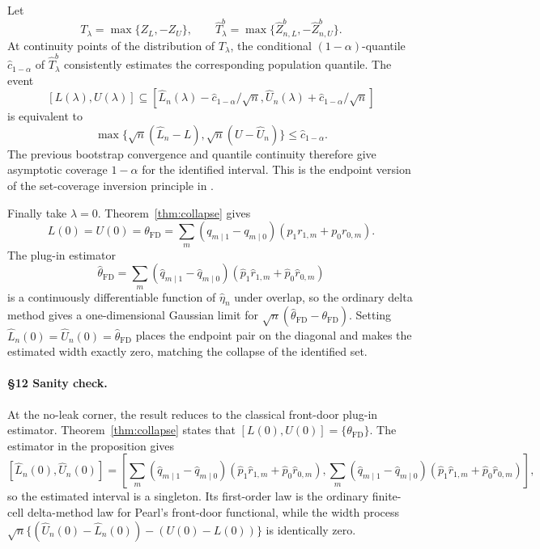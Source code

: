 Let
\[
  T_\lambda
  =
  \max\{Z_L,-Z_U\},
  \qquad
  \widehat T_\lambda^b
  =
  \max\{\widehat Z_{n,L}^b,-\widehat Z_{n,U}^b\}.
\]
At continuity points of the distribution of \(T_\lambda\), the conditional
\((1-\alpha)\)-quantile \(\widehat c_{1-\alpha}\) of
\(\widehat T_\lambda^b\) consistently estimates the corresponding population
quantile.  The event
\[
  [L(\lambda),U(\lambda)]
  \subseteq
  [\widehat L_n(\lambda)-\widehat c_{1-\alpha}/\sqrt n,
   \widehat U_n(\lambda)+\widehat c_{1-\alpha}/\sqrt n]
\]
is equivalent to
\[
  \max\{\sqrt n(\widehat L_n-L),\sqrt n(U-\widehat U_n)\}
  \le \widehat c_{1-\alpha}.
\]
The previous bootstrap convergence and quantile continuity therefore give asymptotic
coverage \(1-\alpha\) for the identified interval.  This is the endpoint version of
the set-coverage inversion principle in
\citet{ChernozhukovHongTamer2007ParameterSets}.

Finally take \(\lambda=0\).  Theorem~\ref{thm:collapse} gives
\[
  L(0)=U(0)=\theta_{\mathrm{FD}}
  =
  \sum_m(q_{m\mid1}-q_{m\mid0})(p_1r_{1,m}+p_0r_{0,m}).
\]
The plug-in estimator
\[
  \widehat\theta_{\mathrm{FD}}
  =
  \sum_m(\widehat q_{m\mid1}-\widehat q_{m\mid0})
        (\widehat p_1\widehat r_{1,m}+\widehat p_0\widehat r_{0,m})
\]
is a continuously differentiable function of \(\widehat\eta_n\) under overlap, so the
ordinary delta method gives a one-dimensional Gaussian limit for
\(\sqrt n(\widehat\theta_{\mathrm{FD}}-\theta_{\mathrm{FD}})\).  Setting
\(\widehat L_n(0)=\widehat U_n(0)=\widehat\theta_{\mathrm{FD}}\) places the endpoint
pair on the diagonal and makes the estimated width exactly zero, matching the collapse
of the identified set.

\paragraph{\S12 Sanity check.}
At the no-leak corner, the result reduces to the classical front-door plug-in
estimator.  Theorem~\ref{thm:collapse} states that
\([L(0),U(0)]=\{\theta_{\mathrm{FD}}\}\).  The estimator in the proposition gives
\[
  [\widehat L_n(0),\widehat U_n(0)]
  =
  \left[
    \sum_m(\widehat q_{m\mid1}-\widehat q_{m\mid0})
          (\widehat p_1\widehat r_{1,m}+\widehat p_0\widehat r_{0,m}),
    \sum_m(\widehat q_{m\mid1}-\widehat q_{m\mid0})
          (\widehat p_1\widehat r_{1,m}+\widehat p_0\widehat r_{0,m})
  \right],
\]
so the estimated interval is a singleton.  Its first-order law is the ordinary
finite-cell delta-method law for Pearl's front-door functional, while the width process
\(\sqrt n\{(\widehat U_n(0)-\widehat L_n(0))-(U(0)-L(0))\}\) is identically zero.

